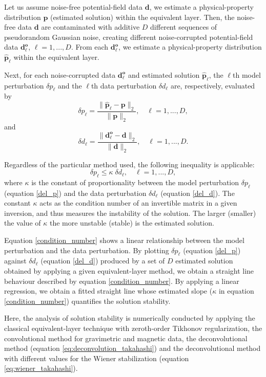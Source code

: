 Let us assume noise-free potential-field data $\mathbf{d}$, 
we estimate a physical-property distribution $\mathbf{p}$ (estimated solution) within the equivalent layer.
Then, the  noise-free data $\mathbf{d}$ are contaminated with additive $D$ different sequences of 
pseudorandom Gaussian noise, creating  different noise-corrupted potential-field data
$\mathbf{d}^\mathbf{o}_\ell$, $\ell = 1, ..., D$.
From each $\mathbf{d}^\mathbf{o}_\ell$, we estimate a physical-property distribution 
$\mathbf{\hat{p}}_\ell$ within the equivalent layer. 

Next, for each noise-corrupted data $\mathbf{d}^\mathbf{o}_\ell$
and estimated solution $\mathbf{\hat{p}}_\ell$, the $\ell$th model perturbation $\delta p_\ell $
and the $\ell$th data perturbation    $\delta d_\ell$ are,  respectively, evaluated by
\begin{equation}
\delta p_\ell = \frac{\parallel \mathbf{\hat{p}}_\ell - {\mathbf{p}} \parallel_2 }
{\parallel {\mathbf{p}} \parallel _2 }, \quad \ell= 1, ..., D,
\label{del_p}
\end{equation}
and
\begin{equation}
\delta d_\ell = \frac{\parallel \mathbf{d}^\mathbf{o}_\ell - \mathbf{d} \parallel _2 }
{\parallel \mathbf{d}\parallel _2}, \quad \ell = 1, ..., D.
\label{del_d}
\end{equation}

Regardless of the particular method used, the following inequality \citep[][ p. 66]{aster2018parameter}  is applicable:
\begin{equation}
\delta p_\ell \leq \kappa \; \delta d_\ell, \quad \ell = 1, ..., D,
\label{condition_number}
\end{equation}
where $\kappa$ is the constant of proportionality between the model perturbation $\delta p_\ell $ 
(equation \ref{del_p}) and the data perturbation   $\delta d_\ell$ (equation \ref{del_d}).
The constant $\kappa$ acts as the condition number of an invertible matrix in a given inversion, and thus
measures the instability of the solution.
The larger (smaller) the value of $\kappa$ the more unstable (stable) is the estimated solution.

Equation \ref{condition_number} shows a linear relationship between the model perturbation and 
the data perturbation.
By plotting $\delta p_\ell$ (equation \ref{del_p}) against $\delta d_\ell$ (equation \ref{del_d}) 
produced by a set of $D$ estimated solution obtained by applying a given equivalent-layer method, 
we obtain a straight line behaviour described by equation \ref{condition_number}.
By applying a linear regression, we obtain a fitted straight line whose estimated slope 
($\kappa$ in equation \ref{condition_number}) quantifies the solution stability.

Here, the  analysis of solution stability is numerically conducted by applying
the classical equivalent-layer technique with zeroth-order Tikhonov regularization,
the convolutional method for gravimetric and magnetic data,
the deconvolutional method (equation \ref{eq:deconvolution_takahashi}) and 
the deconvolutional method with different values for the Wiener stabilization 
(equation \ref{eq:wiener_takahashi}).
